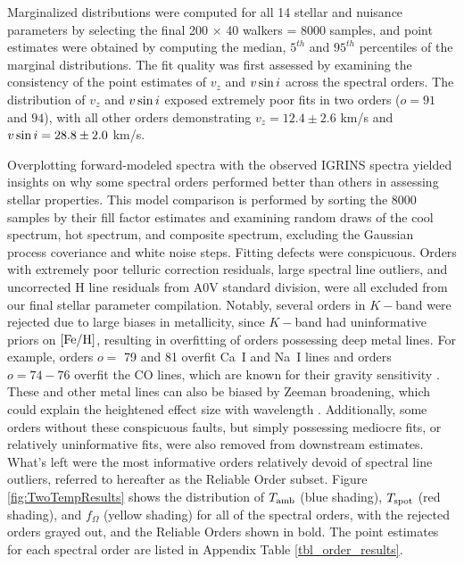 \documentclass[12pt]{report}
\begin{document}
Marginalized distributions were computed for all 14 stellar and nuisance parameters by selecting the final 200 $\times$ 40 walkers = 8000 samples, and point estimates were obtained by computing the median, $5^{th}$ and $95^{th}$ percentiles of the marginal distributions.  The fit quality was first assessed by examining the consistency of the point estimates of $v_z$ and $v \sin i$ across the spectral orders.  The distribution of $v_z$ and $v \sin i$ exposed extremely poor fits in two orders ($o=91$ and $94$), with all other orders demonstrating $v_z = 12.4 \pm 2.6$ km/s and $v \sin i = 28.8 \pm 2.0$ km/s.  

Overplotting forward-modeled spectra with the observed IGRINS spectra yielded insights on why some spectral orders performed better than others in assessing stellar properties.  This model comparison is performed by sorting the 8000 samples by their fill factor estimates and examining random draws of the cool spectrum, hot spectrum, and composite spectrum, excluding the Gaussian process coveriance and white noise steps.  Fitting defects were conspicuous.  Orders with extremely poor telluric correction residuals, large spectral line outliers, and uncorrected H line residuals from A0V standard division, were all excluded from our final stellar parameter compilation.  Notably, several orders in $K-$band were rejected due to large biases in metallicity, since $K-$band had uninformative priors on $[{\rm Fe}/{\rm H}]$, resulting in overfitting of orders possessing deep metal lines.  For example, orders $o=$ 79 and 81 overfit Ca~I and Na~I lines and orders $o=74-76$ overfit the CO lines, which are known for their gravity sensitivity \citep{rayner09}.  These and other metal lines can also be biased by Zeeman broadening, which could explain the heightened effect size with wavelength \citep{deen13}.  Additionally, some orders without these conspicuous faults, but simply possessing mediocre fits, or relatively uninformative fits, were also removed from downstream estimates.  What's left were the most informative orders relatively devoid of spectral line outliers, referred to hereafter as the Reliable Order subset.  Figure \ref{fig:TwoTempResults} shows the distribution of $T_\textrm{amb}$ (blue shading), $T_\textrm{spot}$ (red shading), and $f_{\Omega}$ (yellow shading) for all of the spectral orders, with the rejected orders grayed out, and the Reliable Orders shown in bold.  The point estimates for each spectral order are listed in Appendix Table \ref{tbl_order_results}.
\end{document}
